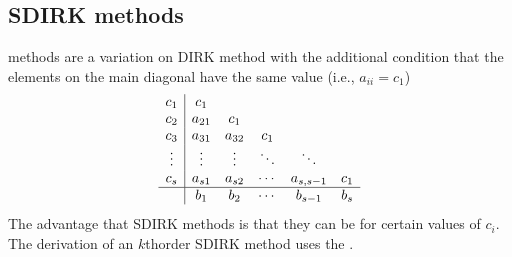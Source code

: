 \documentclass[letterpaper,10pt,english]{jupyterBook}
\begin{document}
\subsection{SDIRK methods}
\label{\detokenize{3_IRKs/3.1_Deriving_IRK_methods:sdirk-methods}}\label{\detokenize{3_IRKs/3.1_Deriving_IRK_methods:sdirk-derivation}}
\sphinxAtStartPar
{} methods are a variation on DIRK method with the additional condition that the elements on the main diagonal have the same value (i.e., \(a_{ii} = c_1\))
\begin{align*}
   \begin{array}{c|ccccc}
      c_1 & c_1 \\
      c_2 & a_{21} & c_1 \\
      c_3 & a_{31} & a_{32} & c_1 \\
      \vdots & \vdots & \vdots & \ddots & \ddots \\
      c_s & a_{s1} & a_{s2} & \cdots & a_{s,s-1} & c_1 \\ \hline
      & b_1 & b_2 & \cdots & b_{s-1} & b_s
   \end{array}
\end{align*}
\sphinxAtStartPar
The advantage that SDIRK methods is that they can be {\hyperref[\detokenize{4_Stability/4.3_IRK_stability_function:a-stability-definition}]{}} for certain values of \(c_i\). The derivation of an \(k\)th\sphinxhyphen{}order SDIRK method uses the {\hyperref[\detokenize{3_IRKs/3.0_IRKs:bk-ck-dk-order-conditions}]{}}.
\end{document}
